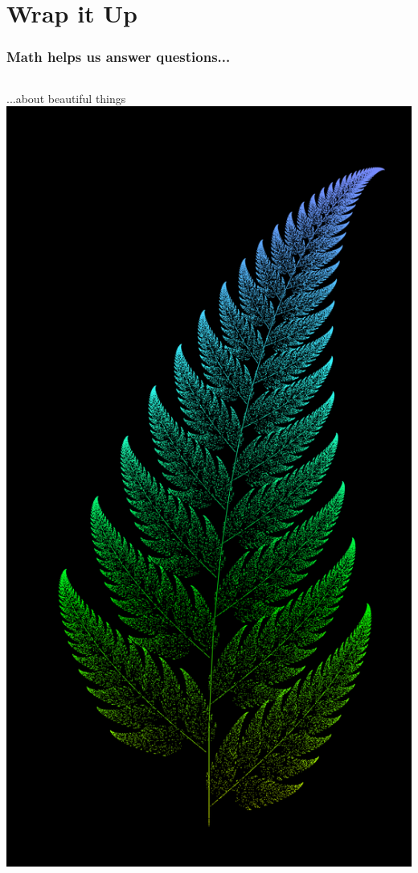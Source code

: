 \documentclass{beamer}
\theoremstyle{mystyle}
\begin{document}
\section{Wrap it Up}

\begin{frame}
\frametitle{Math helps us answer questions...}

\begin{center}
	\vspace{-0.1in}
	\begin{columns}
			...about beautiful things 
			\includegraphics[scale=0.017]{fern.png}

\end{columns}
\end{center}
\end{frame}
\end{document}
